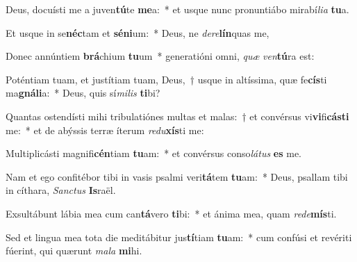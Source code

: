 \item Deus, docuísti me a juven\textbf{tú}te \textbf{me}a:~* et usque nunc pronuntiábo mirabí\textit{li}\textit{a} \textbf{tu}a.
\item Et usque in se\textbf{néc}tam et \textbf{sé}\textbf{ni}um:~* Deus, ne \textit{de}\textit{re}\textbf{lín}quas me,
\item Donec annúntiem \textbf{brá}chium \textbf{tu}um~* generatióni omni, \textit{quæ} \textit{ven}\textbf{tú}ra est:
\item Poténtiam tuam, et justítiam tuam, Deus,~† usque in altíssima, quæ fe\textbf{cís}ti ma\textbf{gná}\textbf{li}a:~* Deus, quis sí\textit{mi}\textit{lis} \textbf{ti}bi?
\item Quantas ostendísti mihi tribulatiónes multas et malas:~† et convérsus vi\textbf{vi}fi\textbf{cás}\textbf{ti} me:~* et de abýssis terræ íterum \textit{re}\textit{du}\textbf{xís}ti me:
\item Multiplicásti magnifi\textbf{cén}tiam \textbf{tu}am:~* et convérsus conso\textit{lá}\textit{tus} \textbf{es} me.
\item Nam et ego confitébor tibi in vasis psalmi veri\textbf{tá}tem \textbf{tu}am:~* Deus, psallam tibi in cíthara, \textit{Sanc}\textit{tus} \textbf{Is}raël.
\item Exsultábunt lábia mea cum can\textbf{tá}vero \textbf{ti}bi:~* et ánima mea, quam \textit{red}\textit{e}\textbf{mís}ti.
\item Sed et lingua mea tota die meditábitur jus\textbf{tí}tiam \textbf{tu}am:~* cum confúsi et revériti fúerint, qui quærunt \textit{ma}\textit{la} \textbf{mi}hi.

